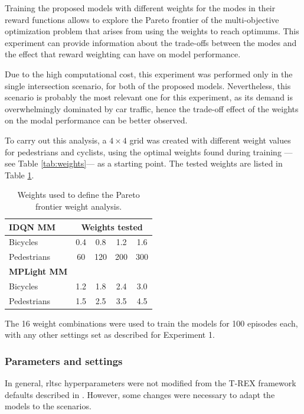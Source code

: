 Training the proposed models with different weights for the modes in their reward functions allows to explore the Pareto frontier of the multi-objective optimization problem that arises from using the weights to reach optimums. This experiment can provide information about the trade-offs between the modes and the effect that reward weighting can have on model performance.

Due to the high computational cost, this experiment was performed only in the single intersection scenario, for both of the proposed models. Nevertheless, this scenario is probably the most relevant one for this experiment, as its demand is overwhelmingly dominated by car traffic, hence the trade-off effect of the weights on the modal performance can be better observed.

To carry out this analysis, a $4 \times 4$ grid was created with different weight values for pedestrians and cyclists, using the optimal weights found during training —see Table \ref{tab:weights}— as a starting point. The tested weights are listed in Table \ref{tab:tested_weights}.

\begin{table}[]
\centering
\caption{Weights used to define the Pareto frontier weight analysis.}
\label{tab:tested_weights}
\begin{tabular}{@{}lcccc@{}}
\toprule
\textbf{IDQN MM} & \multicolumn{4}{c}{\textbf{Weights tested}} \\ \midrule
Bicycles & 0.4 & 0.8 & 1.2 & 1.6 \\
Pedestrians & 60 & 120 & 200 & 300 \\ \midrule
\textbf{MPLight MM} &  &  &  &  \\ \midrule
Bicycles & 1.2 & 1.8 & 2.4 & 3.0 \\
Pedestrians & 1.5 & 2.5 & 3.5 & 4.5 \\ \bottomrule
\end{tabular}
\end{table}

The 16 weight combinations were used to train the models for 100 episodes each, with any other settings set as described for Experiment 1.

\subsubsection{Parameters and settings} \label{subsubsec:params}
In general, \gls{rltsc} hyperparameters were not modified from the T-REX framework defaults described in \cite{Nguyen2025}. However, some changes were necessary to adapt the models to the scenarios.

